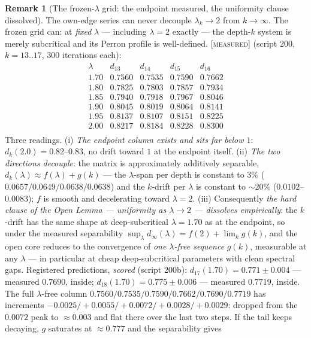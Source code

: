 \documentclass[11pt]{article}
\theoremstyle{definition}
\newtheorem{remark}[theorem]{Remark}
\newcommand{\MEASURED}{\textup{[\textsc{measured}]}}
\newcommand{\lam}{\lambda}
\begin{document}
\begin{remark}[The frozen-$\lam$ grid: the endpoint measured, the
uniformity clause dissolved]\label{rem:frozen}
The own-edge series can never decouple $\lam_k \to 2$ from
$k \to \infty$. The frozen grid can: at \emph{fixed} $\lam$ --- including
$\lam = 2$ exactly --- the depth-$k$ system is merely subcritical and
its Perron profile is well-defined. \MEASURED{} (script 200,
$k = 13..17$, $300$ iterations each):
\[
\begin{array}{lcccc}
\lam & d_{13} & d_{14} & d_{15} & d_{16} \\
1.70 & 0.7560 & 0.7535 & 0.7590 & 0.7662 \\
1.80 & 0.7825 & 0.7803 & 0.7857 & 0.7934 \\
1.85 & 0.7940 & 0.7918 & 0.7967 & 0.8046 \\
1.90 & 0.8045 & 0.8019 & 0.8064 & 0.8141 \\
1.95 & 0.8137 & 0.8107 & 0.8151 & 0.8225 \\
2.00 & 0.8217 & 0.8184 & 0.8228 & 0.8300 \\
\end{array}
\]
Three readings. (i) \emph{The endpoint column exists and sits far below
$1$}: $d_k(2.0) = 0.82$--$0.83$, no drift toward $1$ at the endpoint
itself. (ii) \emph{The two directions decouple}: the matrix is
approximately additively separable, $d_k(\lam) \approx f(\lam) + g(k)$
--- the $\lam$-span per depth is constant to $3\%$
($0.0657/0.0649/0.0638/0.0638$) and the $k$-drift per $\lam$ is
constant to $\sim 20\%$ ($0.0102$--$0.0083$); $f$ is smooth and
decelerating toward $\lam = 2$. (iii) Consequently \emph{the hard
clause of the Open Lemma --- uniformity as $\lam \to 2$ --- dissolves
empirically}: the $k$-drift has the same shape at deep-subcritical
$\lam = 1.70$ as at the endpoint, so under the measured separability
$\sup_\lam d_\infty(\lam) = f(2) + \lim_k g(k)$, and the open core
reduces to the convergence of \emph{one $\lam$-free sequence} $g(k)$,
measurable at any $\lam$ --- in particular at cheap deep-subcritical
parameters with clean spectral gaps. Registered predictions, \emph{scored} (script 200b):
$d_{17}(1.70) = 0.771 \pm 0.004$ --- measured $0.7690$, inside;
$d_{18}(1.70) = 0.775 \pm 0.006$ --- measured $0.7719$, inside. The
full $\lam$-free column
$0.7560/0.7535/0.7590/0.7662/0.7690/0.7719$ has increments
$-0.0025/{+}0.0055/{+}0.0072/{+}0.0028/{+}0.0029$: dropped from the
$0.0072$ peak to $\approx 0.003$ and flat there over the last two
steps. If the tail keeps decaying, $g$ saturates at
$\approx 0.777$ and the separability gives

\end{remark}
\end{document}
